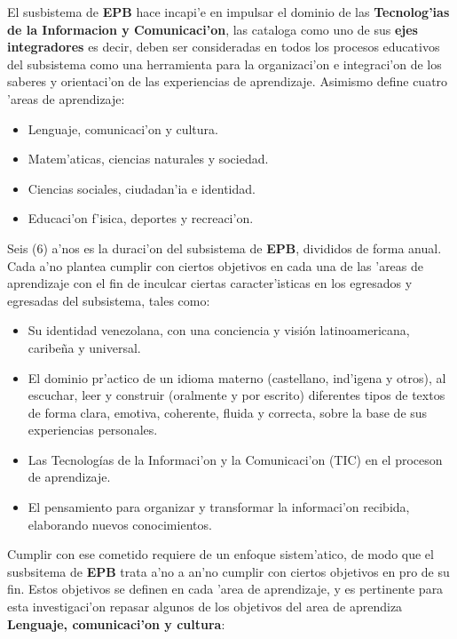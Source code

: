 El susbistema de \textbf{EPB} hace incapi'e en impulsar el dominio de las \textbf{Tecnolog'ias de la Informacion y Comunicaci'on}, las cataloga como uno de sus \textbf{ejes integradores} es decir, deben ser consideradas en todos los procesos educativos del subsistema como una herramienta para la organizaci'on e integraci'on de los saberes y orientaci'on de las experiencias de aprendizaje. Asimismo define cuatro 'areas de aprendizaje: 

\begin{itemize}
	\item Lenguaje, comunicaci'on y cultura.
	\item Matem'aticas, ciencias naturales y sociedad.
	\item Ciencias sociales, ciudadan'ia e identidad.
	\item Educaci'on f'isica, deportes y recreaci'on.
\end{itemize}

Seis (6) a'nos es la duraci'on del subsistema de \textbf{EPB}, divididos de forma anual. Cada a'no plantea cumplir con ciertos objetivos en cada una de las 'areas de aprendizaje con el fin de inculcar ciertas caracter'isticas en los egresados y egresadas del subsistema, tales como:

\begin{itemize}
	\item Su identidad venezolana, con una conciencia y visión latinoamericana,
	caribeña y universal.
	\item El dominio pr'actico de un idioma materno (castellano, ind'igena y otros), al escuchar, leer y construir (oralmente y por escrito) diferentes tipos de textos de forma clara, emotiva, coherente, fluida y correcta, sobre la base de sus experiencias personales.
	\item Las Tecnologías de la Informaci'on y la Comunicaci'on (TIC) en el proceson de aprendizaje.
	\item El pensamiento para organizar y transformar la informaci'on recibida,
	elaborando nuevos conocimientos. 
\end{itemize}

Cumplir con ese cometido requiere de un enfoque sistem'atico, de modo que el susbsitema de \textbf{EPB} trata a'no a an'no cumplir con ciertos objetivos en pro de su fin. Estos objetivos se definen en cada 'area de aprendizaje, y es pertinente para esta investigaci'on repasar algunos de los objetivos del area de aprendiza \textbf{Lenguaje, comunicaci'on y cultura}:

